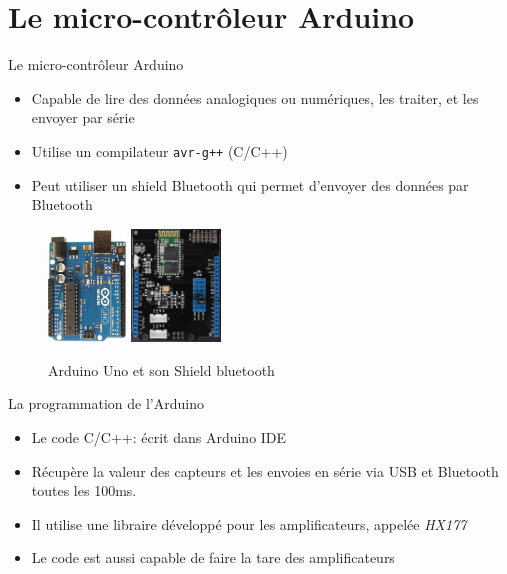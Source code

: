 \documentclass{beamer}
\begin{document}
\section{Le micro-contrôleur Arduino}
\begin{frame}
\begin{block}{Le micro-contrôleur Arduino}
\begin{itemize}
\item Capable de lire des données analogiques ou numériques, les traiter, et les envoyer par série
\item Utilise un compilateur \texttt{avr-g++} (C/C++)
\item Peut utiliser un shield Bluetooth qui permet d'envoyer des données par Bluetooth
\end{itemize}
\begin{figure}
\begin{center}
\includegraphics[height=3cm]{images/uno.jpg}
\includegraphics[height=3cm]{images/BTshield.jpg}
\end{center}
\caption{Arduino Uno et son Shield bluetooth}
\label{fig:load_sensor_connected}
\end{figure}
\end{block}
\end{frame}

\begin{frame}
\begin{block}{La programmation de l'Arduino}
\begin{itemize}
\item Le code C/C++: écrit dans Arduino IDE
\item Récupère la valeur des capteurs et les envoies en série via USB et Bluetooth toutes les 100ms.
\item Il utilise une libraire développé pour les amplificateurs, appelée \textit{HX177} \cite{hx711}
\item Le code est aussi capable de faire la tare des amplificateurs
\end{itemize}

\end{block}
\end{frame}
\end{document}
